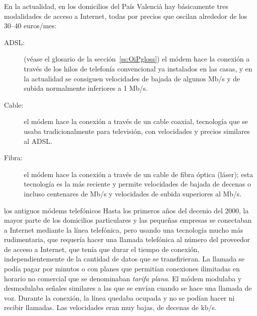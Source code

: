 En la actualidad, en los domicilios del País Valencià hay básicamente tres modalidades de acceso a Internet, todas por precios que oscilan alrededor de los 30--40 euros/mes: \begin{description} \item[ADSL:] (véase el glosario de la sección~\ref{ss:OiPgloss}) el módem hace la conexión a través de los hilos de telefonía convencional ya instalados en las casas, y en la actualidad se consiguen velocidades de bajada de algunos Mb/s y de subida normalmente inferiores a 1 Mb/s. \item[Cable:] el módem hace la conexión a través de un cable coaxial, tecnología que se usaba tradicionalmente para televisión, con velocidades y precios similares al ADSL. \item[Fibra:] el módem hace la conexión a través de un cable de fibra óptica (láser); esta tecnología es la más reciente y permite velocidades de bajada de decenas o incluso centenares de Mb/s y velocidades de subida superiores al Mb/s. \end{description} 

\begin{persabermes}{los antiguos módems telefónicos} Hasta los primeros años del decenio del 2000, la mayor parte de los domicilios particulares y las pequeñas empresas se conectaban a Internet mediante la línea telefónica, pero usando una tecnología mucho más rudimentaria, que requería hacer una llamada telefónica al número del proveedor de acceso a Internet, que tenía que durar el tiempo de conexión, independientemente de la cantidad de datos que se transfirieran. La llamada se podía pagar por minutos o con planes que permitían conexiones ilimitadas en horario no comercial que se denominaban \emph{tarifa plana}. El módem modulaba y desmodulaba señales similares a las que se envían cuando se hace una llamada de voz. Durante la conexión, la línea quedaba ocupada y no se podían hacer ni recibir llamadas. Las velocidades eran muy bajas, de decenas de kb/s. \end{persabermes} 

